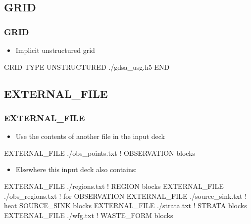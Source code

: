 \documentclass{beamer}
\newcommand\bluecomment[1]{{{\color{blue} #1}}}
\begin{document}
\subsection{GRID}

\begin{frame}[fragile]\frametitle{GRID}

\begin{itemize}
  \item Implicit unstructured grid 
\end{itemize}

\begin{semiverbatim}
GRID
  TYPE UNSTRUCTURED ./gdsa_usg.h5
END
\end{semiverbatim}

\end{frame}

\subsection{EXTERNAL\_FILE}

\begin{frame}[fragile]\frametitle{EXTERNAL\_FILE}
\begin{itemize}
  \item Use the contents of another file in the input deck
\end{itemize}

\begin{semiverbatim}
EXTERNAL_FILE ./obs_points.txt \bluecomment{! OBSERVATION blocks}
\end{semiverbatim}

\begin{itemize}
  \item Elsewhere this input deck also contains:
\end{itemize}

\begin{semiverbatim}
EXTERNAL_FILE ./regions.txt \bluecomment{! REGION blocks}
EXTERNAL_FILE ./obs_regions.txt \bluecomment{! for OBSERVATION} 
EXTERNAL_FILE ./source_sink.txt \bluecomment{! heat SOURCE_SINK blocks}
EXTERNAL_FILE ./strata.txt \bluecomment{! STRATA blocks}
EXTERNAL_FILE ./wfg.txt \bluecomment{! WASTE_FORM blocks}
\end{semiverbatim}

\end{frame}
\end{document}
